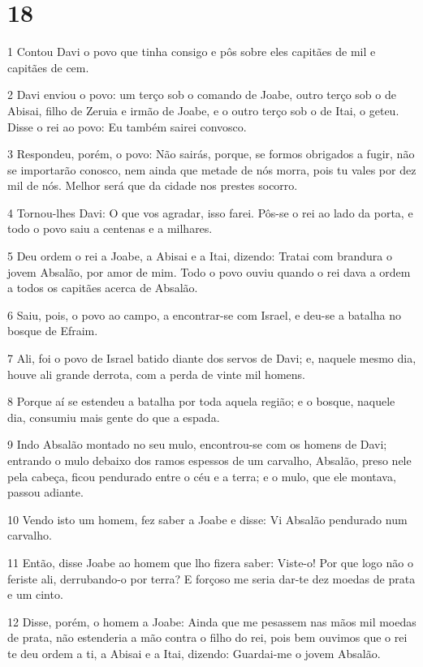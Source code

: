 \chapter{18}

\par 1 Contou Davi o povo que tinha consigo e pôs sobre eles capitães de mil e capitães de cem.
\par 2 Davi enviou o povo: um terço sob o comando de Joabe, outro terço sob o de Abisai, filho de Zeruia e irmão de Joabe, e o outro terço sob o de Itai, o geteu. Disse o rei ao povo: Eu também sairei convosco.
\par 3 Respondeu, porém, o povo: Não sairás, porque, se formos obrigados a fugir, não se importarão conosco, nem ainda que metade de nós morra, pois tu vales por dez mil de nós. Melhor será que da cidade nos prestes socorro.
\par 4 Tornou-lhes Davi: O que vos agradar, isso farei. Pôs-se o rei ao lado da porta, e todo o povo saiu a centenas e a milhares.
\par 5 Deu ordem o rei a Joabe, a Abisai e a Itai, dizendo: Tratai com brandura o jovem Absalão, por amor de mim. Todo o povo ouviu quando o rei dava a ordem a todos os capitães acerca de Absalão.
\par 6 Saiu, pois, o povo ao campo, a encontrar-se com Israel, e deu-se a batalha no bosque de Efraim.
\par 7 Ali, foi o povo de Israel batido diante dos servos de Davi; e, naquele mesmo dia, houve ali grande derrota, com a perda de vinte mil homens.
\par 8 Porque aí se estendeu a batalha por toda aquela região; e o bosque, naquele dia, consumiu mais gente do que a espada.
\par 9 Indo Absalão montado no seu mulo, encontrou-se com os homens de Davi; entrando o mulo debaixo dos ramos espessos de um carvalho, Absalão, preso nele pela cabeça, ficou pendurado entre o céu e a terra; e o mulo, que ele montava, passou adiante.
\par 10 Vendo isto um homem, fez saber a Joabe e disse: Vi Absalão pendurado num carvalho.
\par 11 Então, disse Joabe ao homem que lho fizera saber: Viste-o! Por que logo não o feriste ali, derrubando-o por terra? E forçoso me seria dar-te dez moedas de prata e um cinto.
\par 12 Disse, porém, o homem a Joabe: Ainda que me pesassem nas mãos mil moedas de prata, não estenderia a mão contra o filho do rei, pois bem ouvimos que o rei te deu ordem a ti, a Abisai e a Itai, dizendo: Guardai-me o jovem Absalão.
